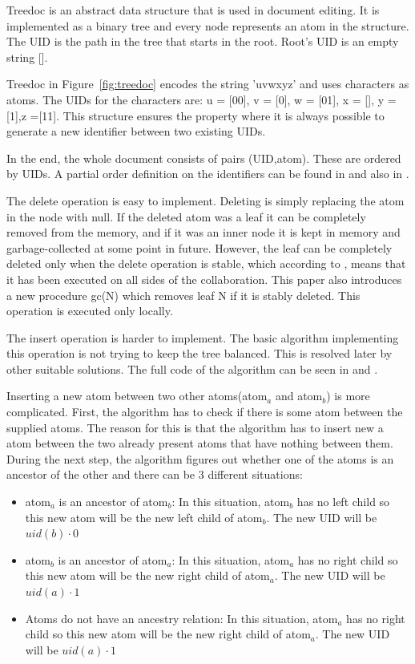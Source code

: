 \documentclass[12pt,oneside]{fithesis2}
\begin{document}
\par Treedoc is an abstract data structure that is used in document editing. It is implemented as a binary tree and every node represents an atom in the structure. The UID is the path in the tree that starts in the root. Root's UID is an empty string [].
\par Treedoc in Figure~\ref{fig:treedoc} encodes the string 'uvwxyz' and uses characters as atoms. The UIDs for the characters are: u = [00], v = [0], w = [01], x = [], y = [1],z =[11]. This structure ensures the property where it is always possible to generate a new identifier between two existing UIDs. 
\par In the end, the whole document consists of pairs (UID,atom). These are ordered by UIDs. A partial order definition on the identifiers can be found in \cite{Shapiro-design} and also in \cite{Shapiro-editing}. 
\par The delete operation is easy to implement. Deleting is simply replacing the atom in the node with null. If the deleted atom was a leaf it can be completely removed from the memory, and if it was an inner node it is kept in memory and garbage-collected at some point in future. However, the leaf can be completely deleted only when the delete operation is stable, which according to \cite{Shapiro-design}, means that it has been executed on all sides of the collaboration. This paper also introduces a new procedure gc(N) which removes leaf N if it is stably deleted. This operation is executed only locally.
\par The insert operation is harder to implement. The basic algorithm implementing this operation is not trying to keep the tree balanced. This is resolved later by other suitable solutions. The full code of the algorithm can be seen in \cite{Shapiro-design} and \cite{Shapiro-editing}. 
\par Inserting a new atom between two other atoms(atom\(_a\) and atom\(_b\)) is more complicated. First, the algorithm has to check if there is some atom between the supplied atoms. The reason for this is that the algorithm has to insert new a atom between the two already present atoms that have nothing between them. During  the next step, the algorithm figures out whether one of the atoms is an ancestor of the other and there can be 3 different situations:
\begin{itemize}
\item atom\(_a\) is an ancestor of atom\(_b\): In this situation, atom\(_b\) has no left child so this new atom will be the new left child of atom\(_b\). The new UID will be \(uid(b) \cdot 0\)
\item atom\(_b\) is an ancestor of atom\(_a\): In this situation, atom\(_a\) has no right child so this new atom will be the new right child of atom\(_a\). The new UID will be \(uid(a) \cdot 1\)
\item Atoms do not have an ancestry relation:  In this situation, atom\(_a\) has no right child so this new atom will be the new right child of atom\(_a\). The new UID will be \(uid(a) \cdot 1\)
\end{itemize}
\end{document}
